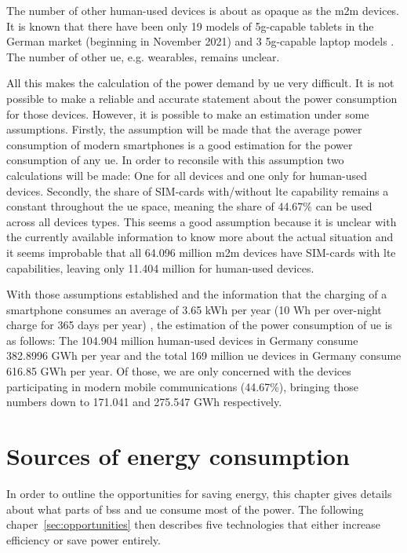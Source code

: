 \documentclass[11pt,a4paper]{article}
\begin{document}
The number of other human-used devices is about as opaque as the \acrshort{m2m} devices.
It is known that there have been only 19 models of \acrshort{5g}-capable tablets in the German market (beginning in November 2021) \citep{tabletmodels} and 3 \acrshort{5g}-capable laptop models \citep{laptopmodels}.
The number of other \acrlong{ue}, e.g. wearables, remains unclear.

All this makes the calculation of the power demand by \acrlong{ue} very difficult.
It is not possible to make a reliable and accurate statement about the power consumption for those devices.
However, it is possible to make an estimation under some assumptions.
Firstly, the assumption will be made that the average power consumption of modern smartphones is a good estimation for the power consumption of any \acrshort{ue}.
In order to reconsile with this assumption two calculations will be made: One for all devices and one only for human-used devices.
Secondly, the share of SIM-cards with/without \acrshort{lte} capability remains a constant throughout the \acrlong{ue} space, meaning the share of 44.67\% can be used across all devices types.
This seems a good assumption because it is unclear with the currently available information to know more about the actual situation and it seems improbable that all 64.096 million \acrshort{m2m} devices have SIM-cards with \acrshort{lte} capabilities, leaving only 11.404 million for human-used devices.


With those assumptions established and the information that the charging of a smartphone consumes an average of 3.65 kWh per year (10 Wh per over-night charge for 365 days per year) \citep{smartphonecharge}, the estimation of the power consumption of \acrshort{ue} is as follows:
The 104.904 million human-used devices in Germany consume 382.8996 GWh per year and the total 169 million \acrshort{ue} devices in Germany consume 616.85 GWh per year.
Of those, we are only concerned with the devices participating in modern mobile communications (44.67\%), bringing those numbers down to 171.041 and 275.547 GWh respectively.

\section{Sources of energy consumption}\label{sec:energyconsumption}
In order to outline the opportunities for saving energy, this chapter gives details about what parts of \acrlong{bs}s and \acrlong{ue} consume most of the power.
The following chaper~\ref{sec:opportunities} then describes five technologies that either increase efficiency or save power entirely.
\end{document}
